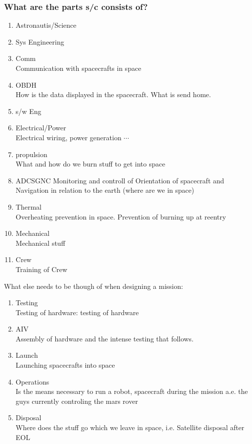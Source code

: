 \subsubsection{What are the parts \ac{s/c} consists of?}
\begin{enumerate}
    \item Astronautis/Science
    \item \ac{Sys} Engineering
    \item \ac{Comm}\\
    Communication with spacecrafts in space
    \item \ac{OBDH}\\
    How is the data displayed in the spacecraft. What is send home.
    \item \ac{s/w} \ac{Eng}
    \item Electrical/Power\\
    Electrical wiring, power generation $\cdots$
    \item propulsion\\
    What and how do we burn stuff to get into space
    \item \ac{ADCS}\ac{GNC}
    Monitoring and controll of Orientation of spacecraft and Navigation in relation to the earth (where are we in space)
    \item Thermal\\
    Overheating prevention in space. Prevention of burning up at reentry
    \item Mechanical \\
    Mechanical stuff
    \item Crew\\
    Training of Crew
\end{enumerate}

What else needs to be though of when designing a mission:
\begin{enumerate}
\item Testing\\
 Testing of hardware: testing of hardware
\item \ac{AIV}\\
Assembly of hardware and the intense testing that follows.
\item{Launch}\\
Launching spacecrafts into space
\item Operations\\
 Is the means necessary to run a robot, spacecraft during the mission a.e. the guys currently controling the mars rover
 \item Disposal\\
  Where does the stuff go which we leave in space, i.e. Satellite disposal after \ac{EOL}
\end{enumerate}

